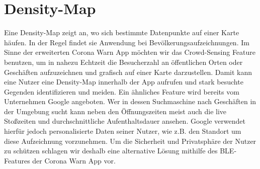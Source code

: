 \documentclass[conference,compsoc]{IEEEtran}
\begin{document}
\section{Density-Map}
\label{Density_Map}
Eine Density-Map zeigt an, wo sich bestimmte Datenpunkte auf einer Karte häufen. 
In der Regel findet sie Anwendung bei Bevölkerungsaufzeichnungen. 
Im Sinne der erweiterten Corona Warn App möchten wir das Crowd-Sensing Feature benutzen, um in nahezu Echtzeit die Besucherzahl an öffentlichen Orten oder Geschäften aufzuzeichnen und grafisch auf einer Karte darzustellen. 
Damit kann eine Nutzer eine Density-Map innerhalb der App aufrufen und stark besuchte Gegenden identifizieren und meiden. 
Ein ähnliches Feature wird bereits vom Unternehmen Google angeboten. 
Wer in dessen Suchmaschine nach Geschäften in der Umgebung sucht kann neben den Öffnungszeiten meist auch die live Stoßzeiten und durchschnittliche Aufenthaltsdauer ansehen. 
Google verwendet hierfür jedoch personalisierte Daten seiner Nutzer, wie z.B. den Standort um diese Aufzeichnung vorzunehmen. 
Um die Sicherheit und Privatsphäre der Nutzer zu schützen schlagen wir deshalb eine alternative Lösung mithilfe des BLE-Features der Corona Warn App vor. \\
\end{document}

